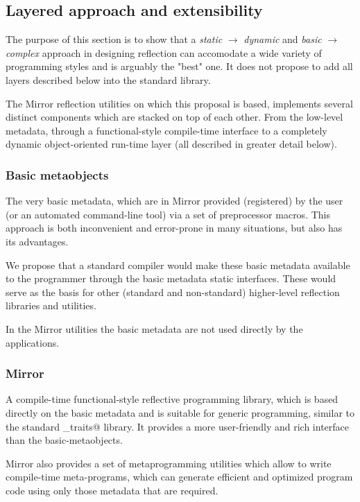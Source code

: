 \subsection{Layered approach and extensibility}

The purpose of this section is to show that a {\em static} $\to$ {\em dynamic}
and {\em basic} $\to$ {\em complex} approach in designing reflection
can accomodate a wide variety of programming styles and is arguably
the "best" one. It does not propose to add all layers described
below into the standard library.

The Mirror reflection utilities \cite{mirror-doc-cpp11} on which this
proposal is based, implements several distinct components which
are stacked on top of each other. From the low-level metadata, through
a functional-style compile-time interface to a completely dynamic
object-oriented run-time layer (all described in greater detail below).

\subsubsection{Basic metaobjects}
The very basic metadata, which are in Mirror
provided (registered) by the user (or an automated command-line tool) via a set
of preprocessor macros. This approach is both inconvenient and error-prone
in many situations, but also has its advantages.

We propose that a standard compiler would make these basic metadata available
to the programmer through the basic metadata static interfaces. These would
serve as the basis for other (standard and non-standard) higher-level
reflection libraries and utilities.

In the Mirror utilities the basic metadata are not used directly by the
applications.

\subsubsection{Mirror}

A compile-time functional-style reflective programming library,
which is based directly on the basic metadata and is suitable for generic programming,
similar to the standard \verb@type_traits@ library.
It provides a more user-friendly and rich interface than the basic-metaobjects.

Mirror also provides a set of metaprogramming utilities which allow
to write compile-time meta-programs, which can generate efficient
and optimized program code using only those metadata that are required.

